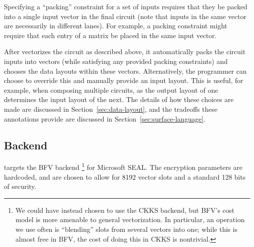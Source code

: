 Specifying a ``packing'' constraint for a set of inputs requires that they be packed into a single input vector in the final circuit (note that inputs in the same vector are necessarily in different lanes).
For example, a packing constraint might require that each entry of a matrix be placed in the same input vector.

After {\system} vectorizes the circuit as described above, it automatically packs the circuit inputs into vectors (while satisfying any provided packing constraints) and chooses the data layouts within these vectors.
Alternatively, the programmer can choose to override this and manually provide an input layout. %
This is useful, for example, when composing multiple circuits, as the output layout of one determines the input layout of the next.
The details of how these choices are made are discussed in Section~{\ref{sec:data-layout}}, and the tradeoffs these annotations provide are discussed in Section~{\ref{sec:surface-language}}.
\subsection{Backend}
\system targets the BFV backend \footnote{We could have instead chosen to use the CKKS backend, but BFV's cost model is more amenable to general vectorization. In particular, an operation we use often is ``blending'' slots from several vectors into one; while this is almost free in BFV, the cost of doing this in CKKS is nontrivial. } for Microsoft SEAL\cite{seal}.
The encryption parameters are hardcoded, and are chosen to allow for 8192 vector slots and a standard 128 bits of security.